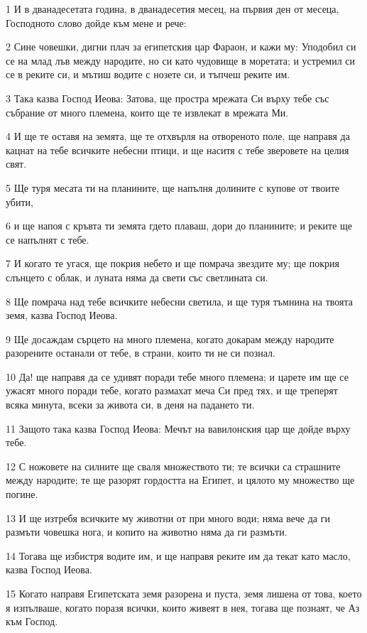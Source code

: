 \par 1 И в дванадесетата година, в дванадесетия месец, на първия ден от месеца, Господното слово дойде към мене и рече:
\par 2 Сине човешки, дигни плач за египетския цар Фараон, и кажи му: Уподобил си се на млад лъв между народите, но си като чудовище в моретата; и устремил си се в реките си, и мътиш водите с нозете си, и тъпчеш реките им.
\par 3 Така казва Господ Иеова: Затова, ще простра мрежата Си върху тебе със събрание от много племена, които ще те извлекат в мрежата Ми.
\par 4 И ще те оставя на земята, ще те отхвърля на отвореното поле, ще направя да кацнат на тебе всичките небесни птици, и ще наситя с тебе зверовете на целия свят.
\par 5 Ще туря месата ти на планините, ще напълня долините с купове от твоите убити,
\par 6 и ще напоя с кръвта ти земята гдето плаваш, дори до планините; и реките ще се напълнят с тебе.
\par 7 И когато те угася, ще покрия небето и ще помрача звездите му; ще покрия слънцето с облак, и луната няма да свети със светлината си.
\par 8 Ще помрача над тебе всичките небесни светила, и ще туря тъмнина на твоята земя, казва Господ Иеова.
\par 9 Ще досаждам сърцето на много племена, когато докарам между народите разорените останали от тебе, в страни, които ти не си познал.
\par 10 Да! ще направя да се удивят поради тебе много племена; и царете им ще се ужасят много поради тебе, когато размахат меча Си пред тях, и ще треперят всяка минута, всеки за живота си, в деня на падането ти.
\par 11 Защото така казва Господ Иеова: Мечът на вавилонския цар ще дойде върху тебе.
\par 12 С ножовете на силните ще сваля множеството ти; те всички са страшните между народите; те ще разорят гордостта на Египет, и цялото му множество ще погине.
\par 13 И ще изтребя всичките му животни от при много води; няма вече да ги размъти човешка нога, и копито на животно няма да ги размъти.
\par 14 Тогава ще избистря водите им, и ще направя реките им да текат като масло, казва Господ Иеова.
\par 15 Когато направя Египетската земя разорена и пуста, земя лишена от това, което я изпълваше, когато поразя всички, които живеят в нея, тогава ще познаят, че Аз към Господ.
